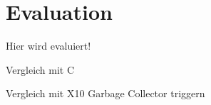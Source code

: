 \chapter{Evaluation}\label{sec:eval}

Hier wird evaluiert!

Vergleich mit C

Vergleich mit X10
Garbage Collector triggern